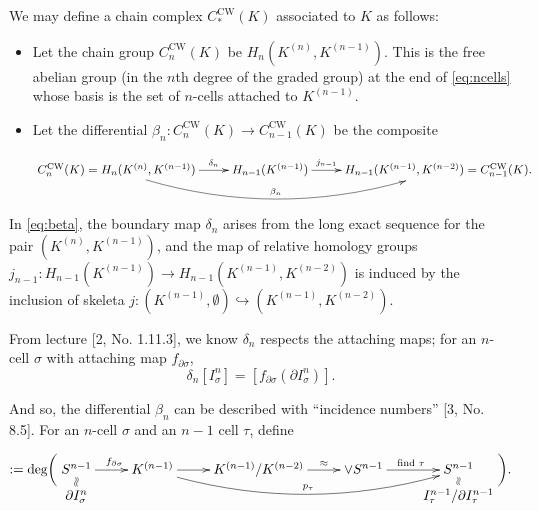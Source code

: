 \documentclass[10pt]{amsart}
\begin{document}
We may define a chain complex \(C^{\text{CW}}_*(K)\) associated to \(K\)
as follows:

\begin{itemize}
\item
  Let the chain group \(C^{\text{CW}}_n(K)\) be
  \(H_n(K^{( n )}, K^{( n-1 )})\). This is the free abelian group (in
  the \(n\)th degree of the graded group) at the end of
  \eqref{eq:ncells} whose basis is the set of \(n\)-cells attached to
  \(K^{( n-1 )}\).
\item
  Let the differential
  \(\beta_n \colon C^{\text{CW}}_n(K) \to C^{\text{CW}}_{n-1}(K)\) be
  the composite

  \begin{equation}
    \xymatrix{
    C^{\text{CW}}_n(K) = 
    H_n(K^{( n )}, K^{( n-1 )}) \ar[r]^-{\delta_n} \ar@/_2.0pc/^-{\beta_n}[rr] 
        & H_{n-1}( K^{( n-1 )} ) \ar[r]^-{j_{n-1}} 
        & H_{n-1}( K^{( n-1 )},K^{( n-2 )}) = C^{\text{CW}}_{n-1}(K).
    }
    \label{eq:beta}
    \end{equation}
\end{itemize}

In \eqref{eq:beta}, the boundary map \(\delta_n\) arises from the long
exact sequence for the pair \((K^{( n )}, K^{( n-1 )})\), and the map of
relative homology groups
\(j_{n-1} \colon H_{n-1} (K^{( n-1 )}) \to H_{n-1} (K^{( n-1 )}, K^{( n-2 )})\)
is induced by the inclusion of skeleta
\(j \colon (K^{( n-1 )}, \emptyset) \hookrightarrow (K^{( n-1 )}, K^{( n-2 )}).\)

From lecture {[}2, No. 1.11.3{]}, we know \(\delta_n\) respects the
attaching maps; for an \(n\)-cell \(\sigma\) with attaching map
\(f_{\partial\sigma}\),
\[\delta_n [I^n_\sigma] = [f_{\partial \sigma} ( \partial I^n_\sigma )].\]

And so, the differential \(\beta_n\) can be described with ``incidence
numbers'' {[}3, No. 8.5{]}. For an \(n\)-cell \(\sigma\) and an \(n-1\)
cell \(\tau\), define

\begin{equation}
[\tau : \sigma] := \text{deg}\bigg( \xymatrix @R-1.8pc{
    S^{n-1} \ar[r]^{f_{\partial\sigma}} \ar@2{~}[d]
    & K^{( n-1 )} \ar[r] \ar@/_1.5pc/^-{p_\tau}[rrr]
    & K^{( n-1 )} / K^{( n-2 )} \ar[r]^-{\approx}
    & \vee S^{n-1} \ar[r]^{\text{find $\tau$}}
    & S^{n-1} \ar@2{~}[d]\\
    \partial I^n_\sigma & & & & I^{n-1}_\tau / \partial I^{n-1}_\tau
}\bigg).
\label{eq:incidencedef}
\end{equation}
\end{document}
